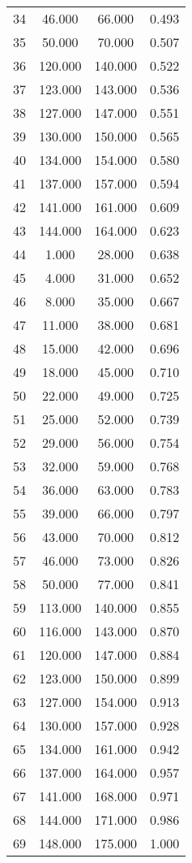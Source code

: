 \begin{tabular}{cccc}
  34 & 46.000 & 66.000 & 0.493 \\ 
  35 & 50.000 & 70.000 & 0.507 \\ 
  36 & 120.000 & 140.000 & 0.522 \\ 
  37 & 123.000 & 143.000 & 0.536 \\ 
  38 & 127.000 & 147.000 & 0.551 \\ 
  39 & 130.000 & 150.000 & 0.565 \\ 
  40 & 134.000 & 154.000 & 0.580 \\ 
  41 & 137.000 & 157.000 & 0.594 \\ 
  42 & 141.000 & 161.000 & 0.609 \\ 
  43 & 144.000 & 164.000 & 0.623 \\ 
  44 & 1.000 & 28.000 & 0.638 \\ 
  45 & 4.000 & 31.000 & 0.652 \\ 
  46 & 8.000 & 35.000 & 0.667 \\ 
  47 & 11.000 & 38.000 & 0.681 \\ 
  48 & 15.000 & 42.000 & 0.696 \\ 
  49 & 18.000 & 45.000 & 0.710 \\ 
  50 & 22.000 & 49.000 & 0.725 \\ 
  51 & 25.000 & 52.000 & 0.739 \\ 
  52 & 29.000 & 56.000 & 0.754 \\ 
  53 & 32.000 & 59.000 & 0.768 \\ 
  54 & 36.000 & 63.000 & 0.783 \\ 
  55 & 39.000 & 66.000 & 0.797 \\ 
  56 & 43.000 & 70.000 & 0.812 \\ 
  57 & 46.000 & 73.000 & 0.826 \\ 
  58 & 50.000 & 77.000 & 0.841 \\ 
  59 & 113.000 & 140.000 & 0.855 \\ 
  60 & 116.000 & 143.000 & 0.870 \\ 
  61 & 120.000 & 147.000 & 0.884 \\ 
  62 & 123.000 & 150.000 & 0.899 \\ 
  63 & 127.000 & 154.000 & 0.913 \\ 
  64 & 130.000 & 157.000 & 0.928 \\ 
  65 & 134.000 & 161.000 & 0.942 \\ 
  66 & 137.000 & 164.000 & 0.957 \\ 
  67 & 141.000 & 168.000 & 0.971 \\ 
  68 & 144.000 & 171.000 & 0.986 \\ 
  69 & 148.000 & 175.000 & 1.000 \\ 
   \hline
\end{tabular}
